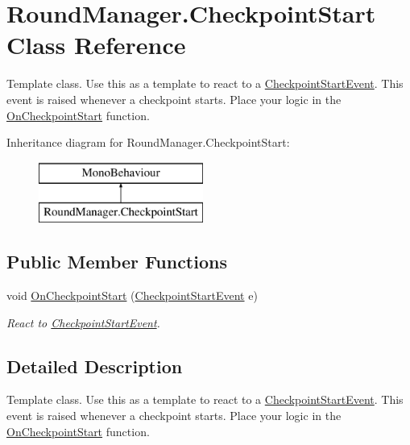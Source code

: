 \hypertarget{class_round_manager_1_1_checkpoint_start}{}\section{Round\+Manager.\+Checkpoint\+Start Class Reference}
\label{class_round_manager_1_1_checkpoint_start}


Template class. Use this as a template to react to a \hyperlink{class_round_manager_1_1_events_1_1_checkpoint_start_event}{Checkpoint\+Start\+Event}. This event is raised whenever a checkpoint starts. Place your logic in the \hyperlink{class_round_manager_1_1_checkpoint_start_a8e3cb1499eb403dc9dd1ba6baa1a3c13}{On\+Checkpoint\+Start} function.  


Inheritance diagram for Round\+Manager.\+Checkpoint\+Start\+:\begin{figure}[H]
\begin{center}
\leavevmode
\includegraphics[height=2.000000cm]{class_round_manager_1_1_checkpoint_start}
\end{center}
\end{figure}
\subsection*{Public Member Functions}
\begin{DoxyCompactItemize}
\item 
void \hyperlink{class_round_manager_1_1_checkpoint_start_a8e3cb1499eb403dc9dd1ba6baa1a3c13}{On\+Checkpoint\+Start} (\hyperlink{class_round_manager_1_1_events_1_1_checkpoint_start_event}{Checkpoint\+Start\+Event} e)
\begin{DoxyCompactList}\small\item\em React to \hyperlink{class_round_manager_1_1_events_1_1_checkpoint_start_event}{Checkpoint\+Start\+Event}. \end{DoxyCompactList}\end{DoxyCompactItemize}


\subsection{Detailed Description}
Template class. Use this as a template to react to a \hyperlink{class_round_manager_1_1_events_1_1_checkpoint_start_event}{Checkpoint\+Start\+Event}. This event is raised whenever a checkpoint starts. Place your logic in the \hyperlink{class_round_manager_1_1_checkpoint_start_a8e3cb1499eb403dc9dd1ba6baa1a3c13}{On\+Checkpoint\+Start} function. 



